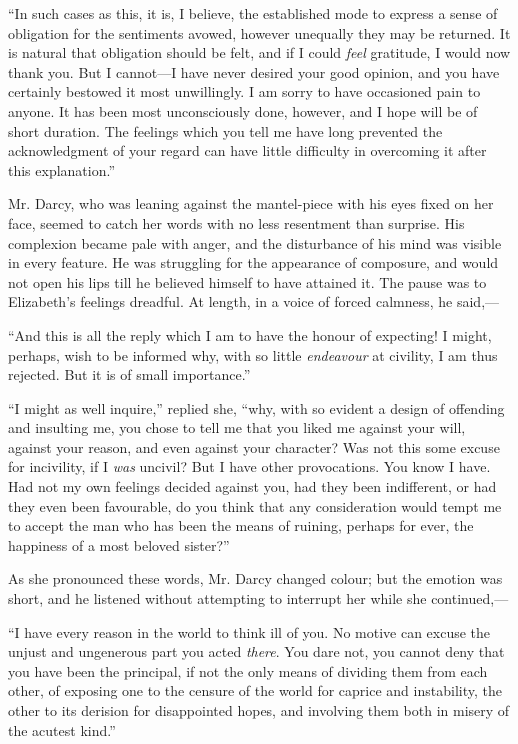 ``In such cases as this, it is, I believe, the established mode to express a sense of obligation for the sentiments avowed, however unequally they may be returned. It is natural that obligation should be felt, and if I could \textit{feel} gratitude, I would now thank you. But I cannot---I have never desired your good opinion, and you have certainly bestowed it most unwillingly. I am sorry to have occasioned pain to anyone. It has been most unconsciously done, however, and I hope will be of short duration. The feelings which you tell me have long prevented the acknowledgment of your regard can have little difficulty in overcoming it after this explanation.''

Mr. Darcy, who was leaning against the mantel-piece with his eyes fixed on her face, seemed to catch her words with no less resentment than surprise. His complexion became pale with anger, and the disturbance of his mind was visible in every feature. He was struggling for the appearance of composure, and would not open his lips till he believed himself to have attained it. The pause was to Elizabeth's feelings dreadful. At length, in a voice of forced calmness, he said,---

``And this is all the reply which I am to have the honour of expecting! I might, perhaps, wish to be informed why, with so little \textit{endeavour} at civility, I am thus rejected. But it is of small importance.''

``I might as well inquire,'' replied she, ``why, with so evident a design of offending and insulting me, you chose to tell me that you liked me against your will, against your reason, and even against your character? Was not this some excuse for incivility, if I \textit{was} uncivil? But I have other provocations. You know I have. Had not my own feelings decided against you, had they been indifferent, or had they even been favourable, do you think that any consideration would tempt me to accept the man who has been the means of ruining, perhaps for ever, the happiness of a most beloved sister?''

As she pronounced these words, Mr. Darcy changed colour; but the emotion was short, and he listened without attempting to interrupt her while she continued,---

``I have every reason in the world to think ill of you. No motive can excuse the unjust and ungenerous part you acted \textit{there}. You dare not, you cannot deny that you have been the principal, if not the only means of dividing them from each other, of exposing one to the censure of the world for caprice and instability, the other to its derision for disappointed hopes, and involving them both in misery of the acutest kind.''

